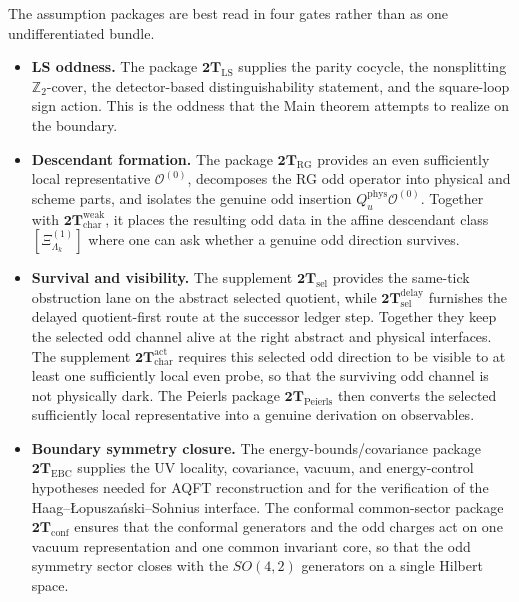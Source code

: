 \documentclass[
  aps,
  prd,
  onecolumn,
  notitlepage,
  nofootinbib,
  superscriptaddress,
  10pt
]{revtex4-2}
\theoremstyle{definition}
\theoremstyle{plain}
\begin{document}
The assumption packages are best read in four gates rather than as one
undifferentiated bundle.
\begin{itemize}
  \item \textbf{LS oddness.}
  The package \(\mathbf{2T}_{\mathrm{LS}}\) supplies the parity cocycle, the
  nonsplitting \(\mathbb Z_2\)-cover, the detector-based distinguishability
  statement, and the square-loop sign action.  This is the oddness that
  the Main theorem attempts to realize on the boundary.

  \item \textbf{Descendant formation.}
  The package \(\mathbf{2T}_{\mathrm{RG}}\) provides an even sufficiently local
  representative \(\mathcal O^{(0)}\), decomposes the RG odd operator into
  physical and scheme parts, and isolates the genuine odd insertion
  \(Q_u^{\mathrm{phys}}\mathcal O^{(0)}\).  Together with
  \(\mathbf{2T}_{\mathrm{char}}^{\mathrm{weak}}\), it places the resulting odd
  data in the affine descendant class \([\Xi^{(1)}_{\Lambda_k}]\) where one can
  ask whether a genuine odd direction survives.

  \item \textbf{Survival and visibility.}
  The supplement \(\mathbf{2T}_{\mathrm{sel}}\) provides the same-tick
  obstruction lane on the abstract selected quotient, while
  \(\mathbf{2T}_{\mathrm{sel}}^{\mathrm{delay}}\) furnishes the delayed
  quotient-first route at the successor ledger step.  Together
  they keep the selected odd channel alive at the right abstract and physical
  interfaces.  The supplement
  \(\mathbf{2T}_{\mathrm{char}}^{\mathrm{act}}\) requires this selected odd
  direction to be visible to at least one sufficiently local even probe, so
  that the surviving odd channel is not physically dark.  The Peierls package
  \(\mathbf{2T}_{\mathrm{Peierls}}\) then converts the selected sufficiently
  local representative into a genuine derivation on observables.

  \item \textbf{Boundary symmetry closure.}
  The energy-bounds/covariance package \(\mathbf{2T}_{\mathrm{EBC}}\) supplies
  the UV locality, covariance, vacuum, and energy-control hypotheses needed for
  AQFT reconstruction and for the verification of the
  Haag--\L opusza\'nski--Sohnius interface.  The conformal common-sector package
  \(\mathbf{2T}_{\mathrm{conf}}\) ensures that the conformal generators and the
  odd charges act on one vacuum representation and one common invariant core,
  so that the odd symmetry sector closes with the \(SO(4,2)\) generators on a
  single Hilbert space.
\end{itemize}
\end{document}
